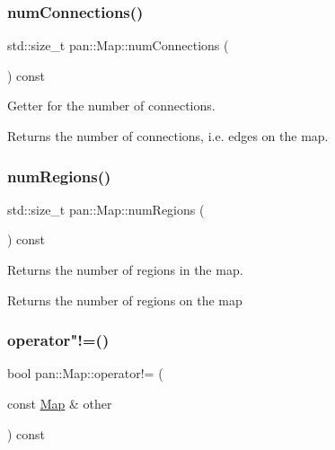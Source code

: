 \subsubsection{\texorpdfstring{num\+Connections()}{numConnections()}}
{\footnotesize\ttfamily std\+::size\+\_\+t pan\+::\+Map\+::num\+Connections (\begin{DoxyParamCaption}{ }\end{DoxyParamCaption}) const\hspace{0.3cm}{\ttfamily [inline]}}

Getter for the number of connections. \begin{DoxyReturn}{Returns}
the number of connections, i.\+e. edges on the map. 
\end{DoxyReturn}
\mbox{\label{classpan_1_1_map_a7e61225a4309562a5b8df58acb325276}} 
\subsubsection{\texorpdfstring{num\+Regions()}{numRegions()}}
{\footnotesize\ttfamily std\+::size\+\_\+t pan\+::\+Map\+::num\+Regions (\begin{DoxyParamCaption}{ }\end{DoxyParamCaption}) const\hspace{0.3cm}{\ttfamily [inline]}}

Returns the number of regions in the map. \begin{DoxyReturn}{Returns}
the number of regions on the map 
\end{DoxyReturn}
\mbox{\label{classpan_1_1_map_a7f5b4f8589dd3a4951e35d198b4f8048}} 
\subsubsection{\texorpdfstring{operator"!=()}{operator!=()}}
{\footnotesize\ttfamily bool pan\+::\+Map\+::operator!= (\begin{DoxyParamCaption}\item[{const \hyperlink{classpan_1_1_map}{Map} \&}]{other }\end{DoxyParamCaption}) const\hspace{0.3cm}{\ttfamily [inline]}}

